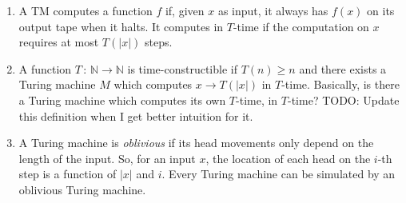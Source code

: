 \documentclass[12pt]{article}
\begin{document}
\begin{enumerate}
{\begin{itemize}
\end{itemize} 
}
\item{A TM computes a function $f$ if, given $x$ as input, it always has $f(x)$ on its output tape when it halts. It computes in $T$-time if the computation on $x$ requires at most $T(|x|)$ steps.}
\item{
A function $T \,:\, \mathbb{N} \rightarrow \mathbb{N}$ is time-constructible if $T(n) \geq n$ and there exists a Turing machine $M$ which computes $x \rightarrow T(|x|)$ in $T$-time. Basically, is there a Turing machine which computes its own $T$-time, in $T$-time? TODO: Update this definition when I get better intuition for it.
}
\item{
A Turing machine is \textit{oblivious} if its head movements only depend on the length of the input. So, for an input $x$, the location of each head on the $i$-th step is a function of $|x|$ and $i$. Every Turing machine can be simulated by an oblivious Turing machine.
}
\end{enumerate}
\end{document}
